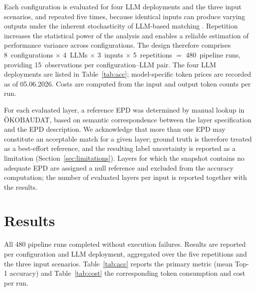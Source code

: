 \documentclass[10pt, a4paper, twocolumn]{article}
\begin{document}
Each configuration is evaluated for four LLM deployments and the three input scenarios,
and repeated five times, because identical inputs can produce varying outputs under the
inherent stochasticity of LLM-based matching \cite{Fostiropoulos.2023}. Repetition
increases the statistical power of the analysis and enables a reliable estimation of
performance variance across configurations. The design therefore comprises
8~configurations $\times$ 4~LLMs $\times$ 3~inputs $\times$ 5~repetitions $=$
480~pipeline runs, providing 15~observations per configuration--LLM pair. The four LLM deployments are listed in Table~\ref{tab:acc}; 
model-specific token prices are recorded as of 05.06.2026\@.
Costs are computed from the input and output token counts per run.

For each evaluated layer, a reference EPD was determined by manual lookup in
\"OKOBAUDAT, based on semantic correspondence between the layer specification and the
EPD description. We acknowledge that more than one EPD may constitute an acceptable
match for a given layer; ground truth is therefore treated as a best-effort reference,
and the resulting label uncertainty is reported as a limitation
(Section~\ref{sec:limitations}). %
Layers for which the snapshot contains no adequate EPD are assigned a null reference and
excluded from the accuracy computation; the number of evaluated layers per input is
reported together with the results.

\section{Results}

All 480 pipeline runs completed without execution failures. Results are reported per
configuration and LLM deployment, aggregated over the five repetitions and the three
input scenarios. Table~\ref{tab:acc} reports the primary metric (mean Top-1 accuracy)
and Table~\ref{tab:cost} the corresponding token consumption and cost per run.
\end{document}
